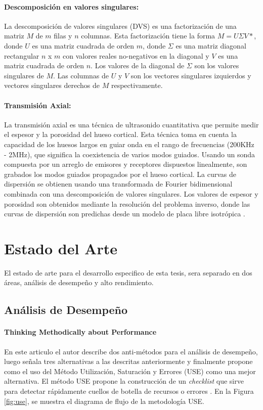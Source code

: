 \paragraph{Descomposición en valores singulares:}
La descomposición de valores singulares (DVS) es una factorización de una matriz $M$ de $m$ filas y $n$ columnas.
Esta factorización tiene la forma $M = U \Sigma V*$, donde $U$ es una matriz cuadrada de orden $m$, donde $\Sigma$ es una matriz diagonal rectangular $n$ x $m$ con valores reales no-negativos en la diagonal y $V$ es una matriz cuadrada de orden $n$.
Los valores de la diagonal de $\Sigma$ son los valores singulares de $M$. Las columnas de $U$ y $V$ son los vectores singulares izquierdos y vectores singulares derechos de $M$ respectivamente.
\cite{leslie2007handbook}

\paragraph{Transmisión Axial:}
La transmisión axial es una técnica de ultrasonido cuantitativa que permite medir el espesor y la porosidad del hueso cortical.
Esta técnica toma en cuenta la capacidad de los huesos largos en guiar onda en el rango de frecuencias (200KHz - 2MHz), que significa la coexistencia  de varios modos guiados.
Usando un sonda compuesta por un arreglo de emisores y receptores dispuestos linealmente, son grabados los modos guiados propagados por el hueso cortical.
La curvas de dispersión se obtienen usando una transformada de Fourier  bidimensional combinada con una descomposición de valores singulares.
Los valores de espesor y porosidad son obtenidos mediante la resolución del problema inverso, donde las curvas de dispersión son predichas desde un modelo de placa libre isotrópica
\cite{Minonzio2018a}.


\section{Estado del Arte}
\label{sc:EA}

El estado de arte para el desarrollo especifico de esta tesis, sera separado en dos áreas, análisis de desempeño y alto rendimiento.

\subsection{Análisis de Desempeño}

\paragraph{Thinking Methodically about Performance}
En este articulo el autor describe dos anti-métodos para el análisis de desempeño, luego señala tres alternativas a las descritas anteriormente y finalmente propone como el uso del Método Utilización, Saturación y Errores (USE) como una mejor alternativa.
El método USE propone la construcción de un \emph{checklist} que sirve para detectar rápidamente cuellos de botella de recursos o errores
\cite{Gregg2013}.
En la Figura \ref{fig:use}, se muestra el diagrama de flujo de la metodología USE.

